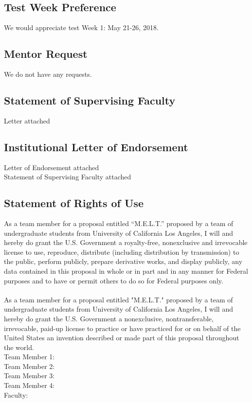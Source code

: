 \documentclass{article}
\begin{document}
\subsection{Test Week Preference}
We would appreciate test Week 1: May 21-26, 2018. 
\subsection{Mentor Request}
We do not have any requests.

\subsection{Statement of Supervising Faculty}
Letter attached
\subsection{Institutional Letter of Endorsement}
\noindent
Letter of Endorsement attached \\
Statement of Supervising Faculty attached \\

\subsection{Statement of Rights of Use}
\noindent
As a team member for a proposal entitled “M.E.L.T.” proposed by a team of undergraduate students from University of California Los Angeles, I will and hereby do grant the U.S. Government a royalty-free, nonexclusive and irrevocable license to use, reproduce, distribute (including distribution by transmission) to the public, perform publicly, prepare derivative works, and display publicly, any data contained in this proposal in whole or in part and in any manner for Federal purposes and to have or permit others to do so for Federal purposes only. \\
\\
As a team member for a proposal entitled "M.E.L.T." proposed by a team of undergraduate students from University of California Los Angeles, I will and hereby do grant the U.S. Government a nonexclusive, nontransferable, irrevocable, paid-up license to practice or have practiced for or on behalf of the United States an invention described or made part of this proposal throughout the world. \\
\break
\noindent
Team Member 1: \hrulefill \\
\break
Team Member 2: \hrulefill \\
\break
Team Member 3: \hrulefill \\
\break
Team Member 4: \hrulefill \\
\break
Faculty: \hrulefill \\
\end{document}
